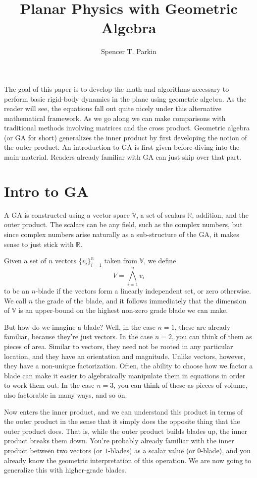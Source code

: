 \documentclass[12pt]{article}
\title{Planar Physics with Geometric Algebra}
\author{Spencer T. Parkin}
\newcommand{\R}{\mathbb{R}}
\newcommand{\V}{\mathbb{V}}
\begin{document}
\maketitle

The goal of this paper is to develop the math and algorithms necessary to perform basic rigid-body dynamics in the plane
using geometric algebra.  As the reader will see, the equations fall out quite nicely under this alternative
mathematical framework.  As we go along we can make comparisons with traditional methods involving
matrices and the cross product.  Geometric algebra (or GA for short) generalizes the inner product by first
developing the notion of the outer product.  An introduction to GA is first given before diving into the
main material.  Readers already familiar with GA can just skip over that part.

\section{Intro to GA}

A GA is constructed using a vector space $\V$, a set of scalars $\R$, addition, and the outer product.  The scalars can be any field,
such as the complex numbers, but since complex numbers arise naturally as a sub-structure of the GA, it makes sense
to just stick with $\R$.

Given a set of $n$ vectors $\{v_i\}_{i=1}^n$ taken from $\V$, we define
\begin{equation}
V = \bigwedge_{i=1}^n v_i
\end{equation}
to be an $n$-blade if the vectors form a linearly independent set, or zero otherwise.
We call $n$ the grade of the blade, and it follows immediately that the dimension of $\V$
is an upper-bound on the highest non-zero grade blade we can make.

But how do we imagine a blade?  Well, in the case $n=1$, these are already familiar,
because they're just vectors.  In the case $n=2$, you can think of them as pieces
of area.  Similar to vectors, they need not be rooted in any particular location, and
they have an orientation and magnitude.  Unlike vectors, however, they have a non-unique
factorization.  Often, the ability to choose how we factor a blade can make it easier
to algebraically manipulate them in equations in order to work them out.  In the case $n=3$,
you can think of these as pieces of volume, also factorable in many ways, and so on.

Now enters the inner product, and we can understand this product in terms of the
outer product in the sense that it simply does the opposite thing that the outer product
does.  That is, while the outer product builds blades up, the inner product breaks them
down.  You're probably already familiar with the inner product between two vectors (or $1$-blades)
as a scalar value (or $0$-blade), and you already know the geometric interpretation of
this operation.  We are now going to generalize this with higher-grade blades.
\end{document}
